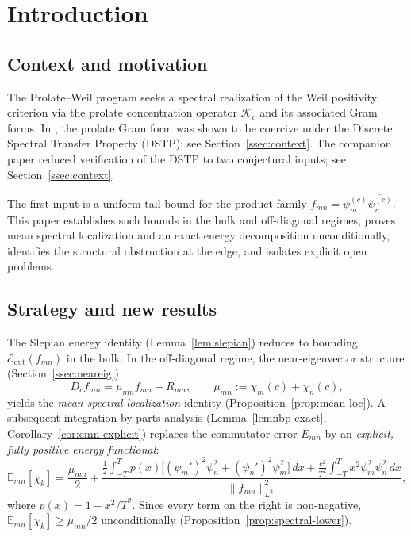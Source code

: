 \documentclass[12pt,a4paper]{amsart}
\theoremstyle{definition}
\newcommand{\Kop}{\mathcal{K}_c}
\newcommand{\psin}{\psi_n^{(c)}}
\newcommand{\Eout}{\mathcal{E}_{\mathrm{out}}}
\newcommand{\mumN}{\mu_{mn}}
\newcommand{\Emn}{\mathbb{E}_{mn}}
\begin{document}
\tableofcontents

\section{Introduction}\label{sec:intro}

\subsection{Context and motivation}

The Prolate--Weil program \cite{PaperI,PaperII,PaperII_quad} seeks a
spectral realization of the Weil positivity criterion
\cite{Weil1952,CCM2025} via the prolate concentration operator
$\Kop$ and its associated Gram forms.
In \cite{PaperI}, the prolate Gram form was shown to be coercive
under the Discrete Spectral Transfer Property (DSTP); see
Section~\ref{ssec:context}.
The companion paper \cite{PaperII_quad} reduced verification of
the DSTP to two conjectural inputs; see
Section~\ref{ssec:context}.

The first input is a uniform tail bound for the product family
$f_{mn} = \psi_m^{(c)}\overline{\psin}$.
This paper establishes such bounds in the bulk and off-diagonal
regimes, proves mean spectral localization and an exact energy
decomposition unconditionally, identifies the structural obstruction
at the edge, and isolates explicit open problems.

\subsection{Strategy and new results}

The Slepian energy identity (Lemma~\ref{lem:slepian})
reduces to bounding $\Eout(f_{mn})$ in the bulk.
In the off-diagonal regime, the near-eigenvector structure
(Section~\ref{ssec:neareig})
\begin{equation}\label{eq:near-eig-intro}
  D_c f_{mn} = \mumN f_{mn} + R_{mn},
  \qquad \mumN := \chi_m(c) + \chi_n(c),
\end{equation}
yields the \emph{mean spectral localization} identity
(Proposition~\ref{prop:mean-loc}).
A subsequent integration-by-parts analysis
(Lemma~\ref{lem:ibp-exact}, Corollary~\ref{cor:emn-explicit})
replaces the commutator error $E_{mn}$ by an
\emph{explicit, fully positive energy functional}:
\begin{equation}\label{eq:energy-intro}
  \Emn[\chi_k]
  = \frac{\mumN}{2}
  + \frac{\frac{1}{2}\int_{-T}^T p(x)
    \bigl[(\psi_m')^2\psi_n^2 + (\psi_n')^2\psi_m^2\bigr]\,dx
    + \frac{c^2}{T^2}\int_{-T}^T x^2\psi_m^2\psi_n^2\,dx}
  {\|f_{mn}\|_{L^2}^2},
\end{equation}
where $p(x) = 1 - x^2/T^2$.
Since every term on the right is non-negative,
$\Emn[\chi_k] \ge \mumN/2$ unconditionally
(Proposition~\ref{prop:spectral-lower}).
\end{document}
